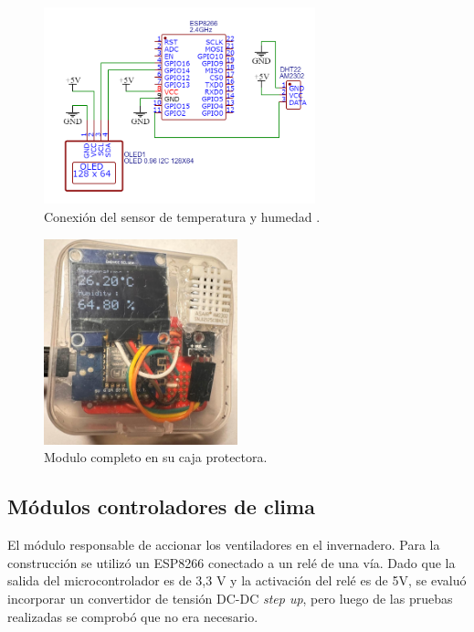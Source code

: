 \begin{figure}[!h]
	\centering
	\includegraphics[width=0.7\textwidth]{./Figures/temp_sensor.png}
	\caption[Conexión del sensor de temperatura y humedad]{Conexión del sensor de temperatura y humedad
	.}
	\label{fig:tempschem}
\end{figure}


\begin{figure}[!h]
	\centering
	\includegraphics[width=0.5\textwidth]{./Figures/sensor_temp.jpg}
	\caption[Modulo completo en su caja protectora]{Modulo completo en su caja protectora.}
	\label{fig:temp_sensor}
\end{figure}

\pagebreak
\subsection{Módulos controladores de clima}
\label{Módulos controladores de clima}

El módulo responsable de accionar los ventiladores en el invernadero. Para la construcción se utilizó un ESP8266 conectado a un relé de una vía. Dado que la salida del microcontrolador es de 3,3 V y la activación del relé es de 5V, se evaluó incorporar un convertidor de tensión DC-DC \textit{step up}, pero luego de las pruebas realizadas se comprobó que no era necesario. 

